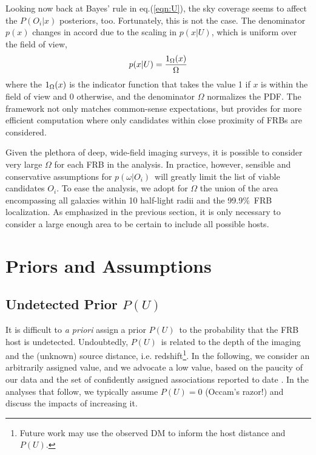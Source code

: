 \documentclass[twocolumn,linenumbers]{aastex63}
\newcommand{\frblocal}{99.9\%}  %
\newcommand{\mpchance}{P^c}
\newcommand{\pchance}{$\mpchance$}
\newcommand{\mpoffset}{p(\omega|O_i)}  %
\newcommand{\poffset}{$\mpoffset$}
\newcommand{\mPU}{P(U)}  %
\newcommand{\PU}{$\mPU$}
\newcommand{\uguess}{0}  %
\newcommand{\mPOix}{P(O_i|x)}  %
\begin{document}
Looking now back at Bayes' rule in eq.(\ref{eqn:U}), 
the sky coverage seems to affect the $\mPOix$ posteriors, too.
Fortunately, this is not the case. 
The denominator $p(x)$ changes in accord due to the scaling in $p(x|U)$, which is uniform over the field of view,
\begin{equation}
    p(x|U) = \frac{\boldmath{1}_{\Omega}(x)}{\Omega}
\end{equation}
where the $\boldmath{1}_{\Omega}(x)$ is the indicator function that takes the value 1 if $x$ is within the field of view and 0 otherwise, and the denominator $\Omega$ normalizes the PDF.
The framework not only matches common-sense expectations, but provides for more efficient computation where only candidates within close proximity of FRBs are considered.

Given the plethora of deep, wide-field imaging
surveys, it is possible to consider very large $\Omega$
for each FRB in the analysis.  In practice, however, 
sensible and conservative assumptions for \poffset\ 
will greatly limit the list of viable candidates $O_i$.
To ease the analysis, we adopt for $\Omega$ the union
of the area encompassing all galaxies within 10 half-light
radii and the \frblocal\ FRB localization.
As emphasized in the previous section, it is only necessary to consider a large enough area to be certain to include all possible hosts.




\section{Priors and Assumptions}
\label{sec:priors}


\subsection{Undetected Prior \PU}
\label{sec:PU}

It is difficult to {\it a priori}
assign a prior \PU\ to the probability
that the FRB host is undetected.  Undoubtedly, 
\PU\ is related to the depth of the imaging and the
(unknown) source distance, i.e. redshift\footnote{
Future work may use the observed DM to inform 
the host distance and \PU.}.
In the following, we consider 
an arbitrarily assigned value,
and we advocate a low value,
based on the paucity of our data and the set of
confidently assigned associations reported
to date \citep[e.g.][]{Heintz2020}.
In the analyses that follow, we typically assume
$\mPU = \uguess$ (Occam's razor!) 
and discuss the impacts of increasing it.
\end{document}
